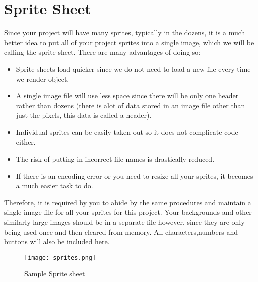 \documentclass[11pt,fleqn]{book} %
\begin{document}
    \section{Sprite Sheet}
    Since your project will have many sprites, typically in the dozens, it is a much better idea to put all of your project sprites into a single image, which we will be calling the sprite sheet. There are many advantages of doing so:
    \begin{itemize}
    \item Sprite sheets load quicker since we do not need to load a new file every time we render object.
    \item A single image file will use less space since there will be only one header rather than dozens (there is alot of data stored in an image file other than just the pixels, this data is called a header).
    \item Individual sprites can be easily taken out so it does not complicate code either.
    \item The risk of putting in incorrect file names is drastically reduced.
    \item If there is an encoding error or you need to resize all your sprites, it becomes a much easier task to do.
    \end{itemize}
    Therefore, it is required by you to abide by the same procedures and maintain a single image file for all your sprites for this project. Your backgrounds and other similarly large images should be in a separate file however, since they are only being used once and then cleared from memory. All characters,numbers and buttons will also be included here.
    \begin{figure}[ht]
            \centering
            \texttt{[image: sprites.png]}
            \caption{Sample Sprite sheet}
            \label{fig:my_label}
        \end{figure}
      
\end{document}
